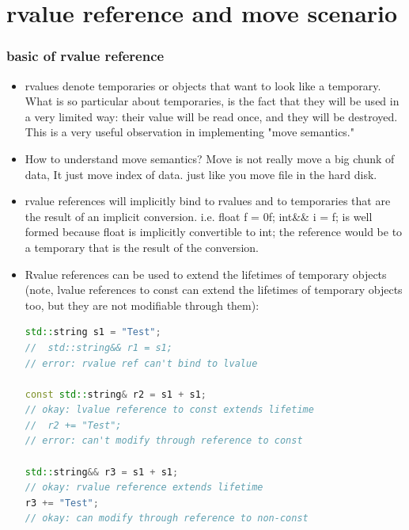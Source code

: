 \documentclass[a4paper,12pt,twoside]{book}
\begin{document}
\section{rvalue reference and move scenario}
\subsubsection{basic of rvalue reference}
\begin{itemize}

\item rvalues denote temporaries or objects that want to look like a temporary. What is so particular about temporaries, is the fact that they will be used in a very limited way: their value will be read once, and they will be destroyed. This is a very useful observation in implementing "move semantics." 

\item How to understand move semantics? Move is not really move a big chunk of data, It just move index of data. just like you move file in the hard disk. 

\item rvalue references will implicitly bind to rvalues and to temporaries that are the result of an implicit conversion. i.e. float f = 0f; int\&\& i = f; is well formed because float is implicitly convertible to int; the reference would be to a temporary that is the result of the conversion.

\item Rvalue references can be used to extend the lifetimes of temporary objects (note, lvalue references to const can extend the lifetimes of temporary objects too, but they are not modifiable through them):

\begin{lstlisting}[frame=single, language=c++, mathescape=true]
std::string s1 = "Test";
//  std::string&& r1 = s1;           
// error: rvalue ref can't bind to lvalue

const std::string& r2 = s1 + s1; 
// okay: lvalue reference to const extends lifetime
//  r2 += "Test";                    
// error: can't modify through reference to const

std::string&& r3 = s1 + s1;      
// okay: rvalue reference extends lifetime
r3 += "Test";                    
// okay: can modify through reference to non-const
\end{lstlisting}

\end{itemize}
\end{document}
